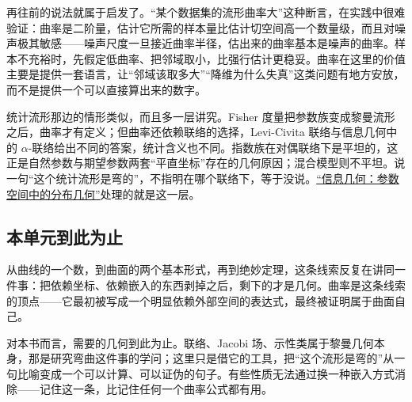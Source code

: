 再往前的说法就属于启发了。``某个数据集的流形曲率大''这种断言，在实践中很难验证：曲率是二阶量，估计它所需的样本量比估计切空间高一个数量级，而且对噪声极其敏感——噪声尺度一旦接近曲率半径，估出来的曲率基本是噪声的曲率。样本不充裕时，先假定低曲率、把邻域取小，比强行估计更稳妥。曲率在这里的价值主要是提供一套语言，让``邻域该取多大''``降维为什么失真''这类问题有地方安放，而不是提供一个可以直接算出来的数字。

统计流形那边的情形类似，而且多一层讲究。Fisher 度量把参数族变成黎曼流形之后，曲率才有定义；但曲率还依赖联络的选择，Levi-Civita 联络与信息几何中的 \(\alpha\)-联络给出不同的答案，统计含义也不同。指数族在对偶联络下是平坦的，这正是自然参数与期望参数两套``平直坐标''存在的几何原因；混合模型则不平坦。说一句``这个统计流形是弯的''，不指明在哪个联络下，等于没说。\hyperref[ch:105]{``信息几何：参数空间中的分布几何''}处理的就是这一层。

\subsection{本单元到此为止}

从曲线的一个数，到曲面的两个基本形式，再到绝妙定理，这条线索反复在讲同一件事：把依赖坐标、依赖嵌入的东西剥掉之后，剩下的才是几何。曲率是这条线索的顶点——它最初被写成一个明显依赖外部空间的表达式，最终被证明属于曲面自己。

对本书而言，需要的几何到此为止。联络、Jacobi 场、示性类属于黎曼几何本身，那是研究弯曲这件事的学问；这里只是借它的工具，把``这个流形是弯的''从一句比喻变成一个可以计算、可以证伪的句子。有些性质无法通过换一种嵌入方式消除——记住这一条，比记住任何一个曲率公式都有用。
